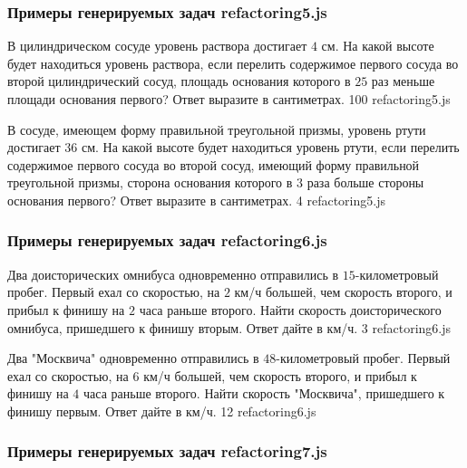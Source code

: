 
\subsubsection*{Примеры генерируемых задач refactoring5.js}
 
\par{В цилиндрическом сосуде уровень раствора достигает $4$ см. На какой высоте будет находиться уровень раствора, если перелить содержимое первого сосуда во второй цилиндрический сосуд, площадь основания которого в $25$ раз меньше площади основания первого? Ответ выразите в сантиметрах. }{ 100 }{refactoring5.js}
\par{В сосуде, имеющем форму правильной треугольной призмы, уровень ртути достигает $36$ см. На какой высоте будет находиться уровень ртути, если перелить содержимое первого сосуда во второй сосуд, имеющий форму правильной треугольной призмы, сторона основания которого в $3$ раза больше стороны основания первого? Ответ выразите в сантиметрах. }{ 4 }{refactoring5.js}


\subsubsection*{Примеры генерируемых задач refactoring6.js}
 
\par{Два доисторических омнибуса одновременно отправились в $15$-километровый пробег. Первый ехал со скоростью, на $2$ км/ч большей, чем скорость второго, и прибыл к финишу на $2$ часа раньше второго. Найти скорость доисторического омнибуса, пришедшего к финишу вторым. Ответ дайте в км/ч. }{ 3 }{refactoring6.js}
\par{Два "Москвича" одновременно отправились в $48$-километровый пробег. Первый ехал со скоростью, на $6$ км/ч большей, чем скорость второго, и прибыл к финишу на $4$ часа раньше второго. Найти скорость "Москвича", пришедшего к финишу первым. Ответ дайте в км/ч. }{ 12 }{refactoring6.js}


\subsubsection*{Примеры генерируемых задач refactoring7.js}
 
